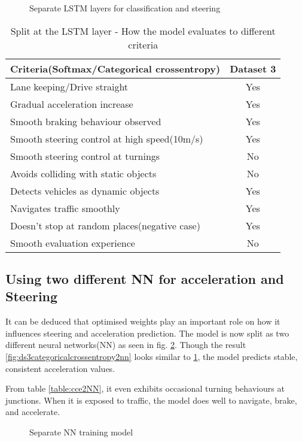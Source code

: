\begin{figure}[!ht]
	\centering
    \def\svgwidth{0.8\textwidth}
    \caption{Separate LSTM layers for classification and steering}
    \label{fig:ds3categoricalcrossentropylstm}
\end{figure}
\begin{table}[!ht]
    \centering
\begin{tabular}{lc}
    \toprule
    Criteria(Softmax/Categorical crossentropy)  & Dataset 3 \\\midrule
    Lane keeping/Drive straight  & Yes  \\
    Gradual acceleration increase  & Yes\\
    Smooth braking behaviour observed & Yes \\
    Smooth steering control at high speed(10m/s) & Yes \\
    Smooth steering control at turnings & No\\
    Avoids colliding with static objects & No \\
    Detects vehicles as dynamic objects & Yes \\
    Navigates traffic smoothly & Yes\\
    Doesn't stop at random places(negative case) & Yes \\
    Smooth evaluation experience & No \\\bottomrule

\end{tabular}
\caption{Split at the LSTM layer - How the model evaluates to different criteria}
\label{table:cceLSTM}
\end{table}

\subsection{Using two different NN for acceleration and
Steering}
It can be deduced that optimised weights play an important role on how it influences
steering and acceleration prediction. The model is now split as two different neural
networks(NN) as seen in fig. \ref{fig:steeringnnsplit}. Though the result
\ref{fig:ds3categoricalcrossentropy2nn} looks similar to
\ref{fig:ds3categoricalcrossentropylstm}, the model predicts stable, consistent
acceleration values.

From table \ref{table:cce2NN}, it even exhibits occasional turning behaviours at junctions. When it
is exposed to traffic, the model does well to navigate, brake, and accelerate.
\begin{figure}[!ht]
	\centering
    \def\svgwidth{0.25\textwidth}
    \caption{Separate NN training model}
    \label{fig:steeringnnsplit}
\end{figure}

